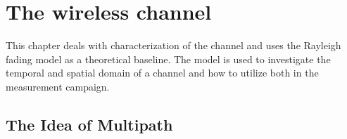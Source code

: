 %
%
%
%
%
%
%
%
%
\chapter{The wireless channel}


This chapter deals with characterization of the channel and uses the Rayleigh fading model as a theoretical baseline. The model is used to investigate the  temporal and spatial domain of a channel and how to utilize both in the measurement campaign.


\section{The Idea of Multipath}

